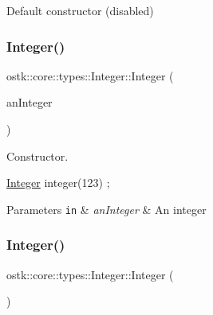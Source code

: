 Default constructor (disabled) 

\mbox{\label{classostk_1_1core_1_1types_1_1_integer_a0fe4f9a8a209fc08669a2810bcec5995}} 
\subsubsection{\texorpdfstring{Integer()}{Integer()}\hspace{0.1cm}{\footnotesize\ttfamily [2/4]}}
{\footnotesize\ttfamily ostk\+::core\+::types\+::\+Integer\+::\+Integer (\begin{DoxyParamCaption}\item[{\hyperlink{classostk_1_1core_1_1types_1_1_integer_a76a5f41f78659f116eafaf26cecc3244}{Integer\+::\+Value\+Type}}]{an\+Integer }\end{DoxyParamCaption})}



Constructor. 


\begin{DoxyCode}
\hyperlink{classostk_1_1core_1_1types_1_1_integer_a209b939281106d4b590ad98fae291af9}{Integer} integer(123) ;
\end{DoxyCode}



\begin{DoxyParams}[1]{Parameters}
\mbox{\tt in}  & {\em an\+Integer} & An integer \\
\hline
\end{DoxyParams}
\mbox{\label{classostk_1_1core_1_1types_1_1_integer_af419f66b1b31f0202685de245917bea8}} 
\subsubsection{\texorpdfstring{Integer()}{Integer()}\hspace{0.1cm}{\footnotesize\ttfamily [3/4]}}
{\footnotesize\ttfamily ostk\+::core\+::types\+::\+Integer\+::\+Integer (\begin{DoxyParamCaption}\item[{float}]{ }\end{DoxyParamCaption})\hspace{0.3cm}{\ttfamily [delete]}}



